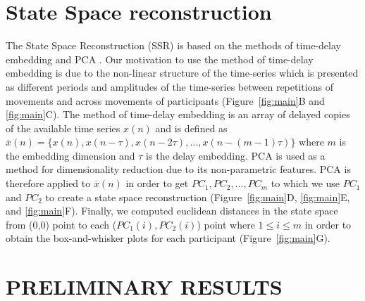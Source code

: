 \documentclass{sig-alternate-05-2015}
\begin{document}








\section{State Space reconstruction}

The State Space Reconstruction (SSR) is based on the methods of time-delay embedding and PCA \cite{Gibson1992}.
Our motivation to use the method of time-delay embedding
is due to the non-linear structure of the time-series
which is 
presented 
as
different periods and amplitudes of the time-series 
between repetitions of movements and across movements of participants (Figure~\ref{fig:main}B and \ref{fig:main}C).
The method of time-delay embedding is an array of %
delayed copies of the available time series $x(n)$ and is defined as  
$ \overline{x}(n) = \{  x(n), x(n-\tau), x(n-2\tau), \dots,x(n-(m-1)\tau)\}$
where $m$ is the embedding dimension and $\tau$ is the delay embedding.
PCA is used as a method for dimensionality reduction due to its non-parametric features.
PCA is therefore applied to $ \overline{x}(n)$ in order to get $PC_1, PC_2, \dots, PC_m$ 
to which we use $PC_1$ and $PC_2$ 
to create a state space reconstruction (Figure~\ref{fig:main}D, \ref{fig:main}E, and \ref{fig:main}F).
Finally, we computed euclidean distances in the state space 
from (0,0) point to each ($PC_1(i),PC_2(i)$) point where $1 \leq i \leq m$
in order to obtain the box-and-whisker plots for each participant (Figure~\ref{fig:main}G).


\section{PRELIMINARY RESULTS}
\end{document}
